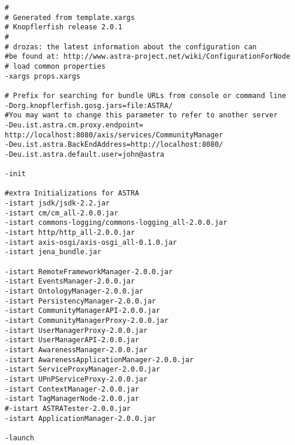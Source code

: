 \begin{verbatim}
#
# Generated from template.xargs
# Knopflerfish release 2.0.1
#
# drozas: the latest information about the configuration can 
#be found at: http://www.astra-project.net/wiki/ConfigurationForNode
# load common properties
-xargs props.xargs

# Prefix for searching for bundle URLs from console or command line
-Dorg.knopflerfish.gosg.jars=file:ASTRA/
#You may want to change this parameter to refer to another server
-Deu.ist.astra.cm.proxy.endpoint=
http://localhost:8080/axis/services/CommunityManager
-Deu.ist.astra.BackEndAddress=http://localhost:8080/
-Deu.ist.astra.default.user=john@astra

-init

#extra Initializations for ASTRA
-istart jsdk/jsdk-2.2.jar
-istart cm/cm_all-2.0.0.jar
-istart commons-logging/commons-logging_all-2.0.0.jar
-istart http/http_all-2.0.0.jar
-istart axis-osgi/axis-osgi_all-0.1.0.jar
-istart jena_bundle.jar

-istart RemoteFrameworkManager-2.0.0.jar
-istart EventsManager-2.0.0.jar
-istart OntologyManager-2.0.0.jar
-istart PersistencyManager-2.0.0.jar
-istart CommunityManagerAPI-2.0.0.jar
-istart CommunityManagerProxy-2.0.0.jar
-istart UserManagerProxy-2.0.0.jar
-istart UserManagerAPI-2.0.0.jar
-istart AwarenessManager-2.0.0.jar
-istart AwarenessApplicationManager-2.0.0.jar
-istart ServiceProxyManager-2.0.0.jar
-istart UPnPServiceProxy-2.0.0.jar
-istart ContextManager-2.0.0.jar
-istart TagManagerNode-2.0.0.jar
#-istart ASTRATester-2.0.0.jar
-istart ApplicationManager-2.0.0.jar

-launch
\end{verbatim}